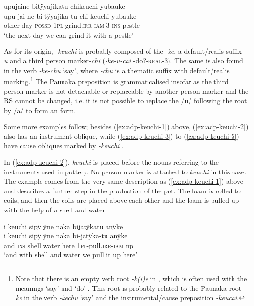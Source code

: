 \ea\label{ex:adp-keuchi-1}
\begingl
\glpreamble upujaine bitÿyajikatu chikeuchi yubauke\\
\gla upu-jai-ne bi-tÿyajika-tu chi-keuchi yubauke\\
\glb other-day-\textsc{possd} 1\textsc{pl}-grind.\textsc{irr}-\textsc{iam} 3-\textsc{ins} pestle\\
\glft ‘the next day we can grind it with a pestle’
\endgl
\trailingcitation{[jmx-d110918ls-2.07]}
\xe

As for its origin, \textit{-keuchi} is probably composed of the  \textit{-ke}, a default/realis suffix \textit{-u} and a third person marker\textit{-chi} (\textit{-ke-u-chi} -do?-\textsc{real}-3). The same  is also found in the verb \textit{-ke-chu} ‘say’, where \textit{-chu} is a thematic suffix with default/realis marking.\footnote{Note that there is an empty verb root \textit{-k(i)e} in , which is often used with the meanings ‘say’ and ‘do’ \citep[221--222]{Danielsen2007}. This root is probably related to the Paunaka root \textit{-ke} in the verb \textit{-kechu} ‘say’ and the instrumental/cause preposition \textit{-keuchi}.} The Paunaka preposition is grammaticalised insofar as the third person marker is not detachable or replaceable by another person marker and the RS cannot be changed, i.e. it is not possible to replace the /u/ following the root by /a/ to form an  form.

Some more examples follow; besides (\ref{ex:adp-keuchi-1}) above, (\ref{ex:adp-keuchi-2}) also has an instrument oblique, while (\ref{ex:adp-keuchi-3}) to (\ref{ex:adp-keuchi-5}) have cause obliques marked by \textit{-keuchi} .



In (\ref{ex:adp-keuchi-2}), \textit{keuchi} is placed before the nouns referring to the instruments used in pottery. No person marker is attached to \textit{keuchi} in this case. The example comes from the very same description as (\ref{ex:adp-keuchi-1}) above and describes a further step in the production of the pot. The loam is rolled to coils, and then the coils are placed above each other and the loam is pulled up with the help of a shell and water. 

\ea\label{ex:adp-keuchi-2}
\begingl
\glpreamble i keuchi sipÿ ÿne naka bijatÿkatu anÿke\\
\gla i keuchi sipÿ ÿne naka bi-jatÿka-tu anÿke\\
\glb and \textsc{ins} shell water here 1\textsc{pl}-pull.\textsc{irr}-\textsc{iam} up\\
\glft ‘and with shell and water we pull it up here’
\endgl
\trailingcitation{[jmx-d110918ls-2.18-19]}
\xe

